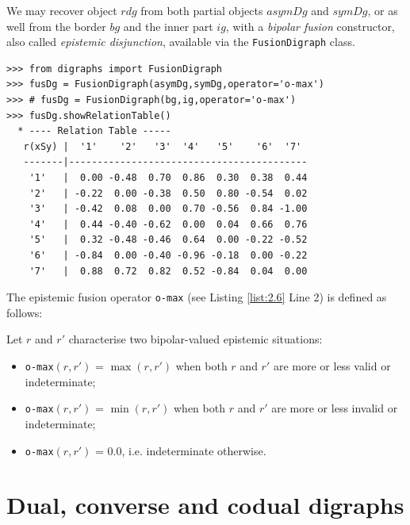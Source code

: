We may recover object $rdg$ from both partial objects $asymDg$ and $symDg$, or as well from the border $bg$ and the inner part $ig$, with a \emph{bipolar fusion} constructor, also called \emph{epistemic disjunction}, available via the \texttt{FusionDigraph} class. 
\begin{lstlisting}[caption={Epistemic fusion of partial diagraphs},label=list:2.6]
>>> from digraphs import FusionDigraph
>>> fusDg = FusionDigraph(asymDg,symDg,operator='o-max')
>>> # fusDg = FusionDigraph(bg,ig,operator='o-max')
>>> fusDg.showRelationTable()
  * ---- Relation Table -----
   r(xSy) |  '1'    '2'   '3'  '4'   '5'    '6'  '7'	  
   -------|------------------------------------------
    '1'   |  0.00 -0.48  0.70  0.86  0.30  0.38  0.44	 
    '2'   | -0.22  0.00 -0.38  0.50  0.80 -0.54  0.02	 
    '3'   | -0.42  0.08  0.00  0.70 -0.56  0.84 -1.00	 
    '4'   |  0.44 -0.40 -0.62  0.00  0.04  0.66  0.76	 
    '5'   |  0.32 -0.48 -0.46  0.64  0.00 -0.22 -0.52	 
    '6'   | -0.84  0.00 -0.40 -0.96 -0.18  0.00 -0.22	 
    '7'   |  0.88  0.72  0.82  0.52 -0.84  0.04  0.00
\end{lstlisting}
The epistemic fusion operator \texttt{o-max} (see Listing \ref{list:2.6} Line 2) is defined as follows:
\begin{definition}\label{def:disjunctiveFusion}

\noindent Let $r$ and $r'$ characterise two bipolar-valued epistemic situations:
\begin{itemize}[leftmargin=0.5cm,rightmargin=0.5cm]
\item \texttt{o-max}$(r, r')$ = $\max(r, r' )$ when both $r$ and $r'$ are more or less valid or indeterminate;
\item \texttt{o-max}$(r, r')$ = $\min(r, r' )$ when both $r$ and $r'$ are more or less invalid or indeterminate;
\item \texttt{o-max}$(r, r')$ = $0.0$, i.e. indeterminate otherwise.
\end{itemize}
\end{definition}
\section{Dual, converse and codual digraphs}
\label{sec:2.6}

